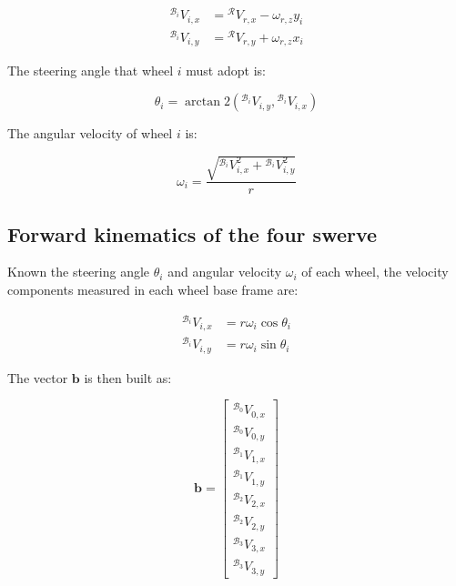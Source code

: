 \documentclass[11pt,a4paper]{article}
\newcommand{\frameR}{\mathcal{R}}
\newcommand{\frameBi}{\mathcal{B}_i}
\newcommand{\frameBZero}{\mathcal{B}_0}
\begin{document}
\begin{equation}
    \begin{aligned}
        {}^{\frameBi}V_{i,x} & = {}^{\frameR}V_{r,x} - \omega_{r,z}y_i \\
        {}^{\frameBi}V_{i,y} & = {}^{\frameR}V_{r,y} + \omega_{r,z}x_i
    \end{aligned}
\end{equation}

The steering angle that wheel \(i\) must adopt is:

\begin{equation}
    \theta_i = \arctan2({}^{\frameBi}V_{i,y}, {}^{\frameBi}V_{i,x})
    \label{eq:fsd-inverse-kinematics-angle}
\end{equation}

The angular velocity of wheel \(i\) is:

\begin{equation}
    \omega_i =
    \frac{\sqrt{{}^{\frameBi}V_{i,x}^2 + {}^{\frameBi}V_{i,y}^2}}{r}
    \label{eq:fsd-inverse-kinematics-angular-speed}
\end{equation}

\subsection{Forward kinematics of the four swerve}

Known the steering angle \(\theta_i\) and angular velocity \(\omega_i\) of each
wheel, the velocity components measured in each wheel base frame are:

\begin{equation}
    \begin{aligned}
        {}^{\frameBi}V_{i,x} & = r\omega_i\cos\theta_i \\
        {}^{\frameBi}V_{i,y} & = r\omega_i\sin\theta_i
    \end{aligned}
\end{equation}

The vector \(\mathbf{b}\) is then built as:

\begin{equation}
    \mathbf{b} =
    \begin{bmatrix}
        {}^{\frameBZero}V_{0,x} \\
        {}^{\frameBZero}V_{0,y} \\
        {}^{\mathcal{B}_1}V_{1,x} \\
        {}^{\mathcal{B}_1}V_{1,y} \\
        {}^{\mathcal{B}_2}V_{2,x} \\
        {}^{\mathcal{B}_2}V_{2,y} \\
        {}^{\mathcal{B}_3}V_{3,x} \\
        {}^{\mathcal{B}_3}V_{3,y}
    \end{bmatrix}
\end{equation}
\end{document}
